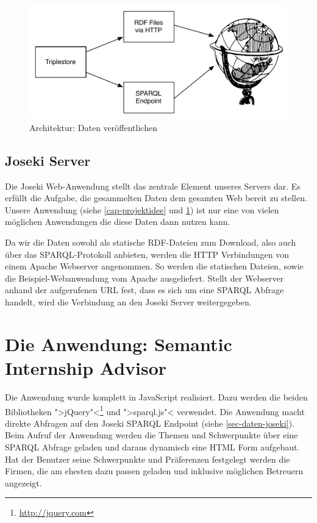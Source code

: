 \begin{figure}[h]
	\centering
	\includegraphics[scale=0.6,]{images/step1_2.pdf}
	\caption{Architektur: Daten veröffentlichen}
	\label{design-step12}
\end{figure}

\subsection{Joseki Server}
Die Joseki Web-Anwendung stellt das zentrale Element unseres Servers dar. Es erfüllt die Aufgabe, die gesammelten Daten dem gesamten Web bereit zu stellen. Unsere Anwendung (siehe \ref{cap-projektidee} und \ref{sec-our-app}) ist nur eine von vielen möglichen Anwendungen die diese Daten dann nutzen kann.

Da wir die Daten sowohl als statische RDF-Dateien zum Download, also auch über das SPARQL-Protokoll anbieten, werden die HTTP Verbindungen von einem Apache Webserver angenommen.
So werden die statischen Dateien, sowie die Beispiel-Webanwendung vom Apache ausgeliefert.
Stellt der Webserver anhand der aufgerufenen URL fest,
dass es sich um eine SPARQL Abfrage handelt, wird die Verbindung an den Joseki Server weitergegeben.


\section{Die Anwendung: Semantic Internship Advisor}
\label{sec-our-app}

Die Anwendung wurde komplett in JavaScript realisiert. Dazu werden die beiden Bibliotheken ">jQuery"<\footnote{\url{http://jquery.com}} und ">sparql.js"< verwendet. Die Anwendung macht direkte Abfragen auf den Joseki SPARQL Endpoint (siehe \ref{sec-daten-joseki}).
Beim Aufruf der Anwendung werden die Themen und Schwerpunkte über eine SPARQL Abfrage geladen und daraus dynamisch eine HTML Form aufgebaut.
Hat der Benutzer seine Schwerpunkte und Präferenzen festgelegt werden die Firmen, die am ehesten dazu passen geladen und inklusive möglichen Betreuern angezeigt.


